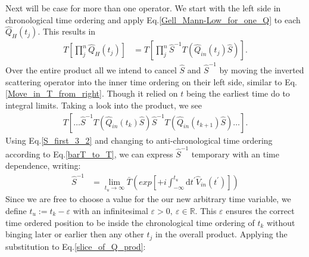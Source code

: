 \documentclass[12pt, titlepage]{article}
\begin{document}
Next will be case for more than one operator. We start with the left side in chronological time ordering and apply Eq.\enskip\eqref{Gell_Mann-Low_for_one_Q} to each $ \hat{Q}_{H}(t_j) $. This results in
\begin{equation}
\begin{split}
T\left[
\prod_{j}^{n}
\hat{Q}_{H}(t_j)
\right]
&=
T\left[
\prod_{j}^{n}
\hat{S}^{-1} 
T
\left( 
\hat{Q}_{in}(t_{j})
\hat{S}
\right) 
\right]
.
\end{split}
\end{equation}
Over the entire product all we intend to cancel $ \hat{S} $ and $ \hat{S}^{-1} $ by moving the inverted scattering operator into the inner time ordering on their left side, similar to Eq.\enskip\eqref{Move_in_T_from_right}. Though it relied on $ t $ being the earliest time do to integral limits. Taking a look into the product, we see
\begin{equation}\label{slice_of_Q_prod}
\begin{split}
T\left[
\ldots
\hat{S}^{-1} 
T
\left( 
\hat{Q}_{in}(t_{k})
\hat{S}
\right) 
\hat{S}^{-1} 
T
\left( 
\hat{Q}_{in}(t_{k+1})
\hat{S}
\right) 
\ldots
\right]
.
\end{split}
\end{equation}
Using Eq.\enskip\eqref{S_first_3_2} and changing to anti-chronological time ordering according to Eq.\enskip\eqref{barT_to_T}, we can express $ \hat{S}^{-1} $ temporary with an time dependence, writing:
\begin{equation}
\begin{split}
\hat{S}^{-1} 
&=
\lim\limits_{t_{u}\rightarrow \infty}
\bar{T}\left( exp\left[+i\int_{- \infty}^{t_{u}}\mathrm{d}t^{\prime} \hat{V}_{in}(t^{\prime})\right] \right)
\end{split}
\end{equation}
Since we are free to choose a value for the our new arbitrary time variable, we define $ t_{u} := t_{k} - \varepsilon $ with an infinitesimal $ \varepsilon > 0 , \ \varepsilon \in \mathbb{R}$. This $ \varepsilon $ ensures the correct time ordered position to be inside the chronological time ordering of $ t_{k} $ without binging later or earlier then any other $ t_{j} $ in the overall product. %
Applying the substitution to Eq.\enskip\eqref{slice_of_Q_prod}:
\end{document}
